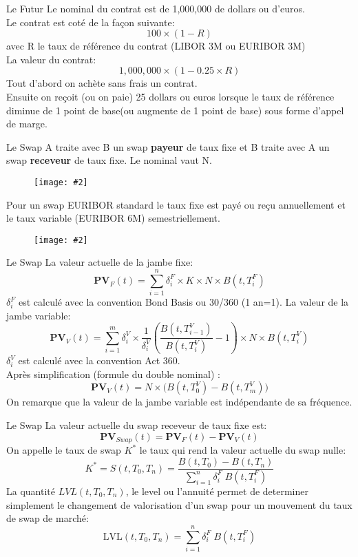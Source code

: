 \documentclass{beamer}
\newcommand{\FIG}[2]{\texttt{[image: \#2]}}
\begin{document}
\begin{frame}{Le Futur}
Le nominal du contrat est de 1,000,000 de dollars ou d'euros.\\
Le contrat est coté de la façon suivante:
\[
100\times(1 - R)
\] 
avec R le taux de référence du contrat (LIBOR 3M ou EURIBOR 3M)\\
La valeur du contrat:
\[
1,000,000\times(1-0.25\times R)
\]
Tout d'abord on achète sans frais un contrat.\\
Ensuite on reçoit (ou on paie) 25 dollars ou euros lorsque le taux de référence diminue de 1 point de base(ou augmente de 1 point de base) sous forme d'appel de marge.
\end{frame}

\begin{frame}{Le Swap}
A traite avec B un swap \textbf{payeur} de taux fixe et B traite avec A un swap \textbf{receveur} de taux fixe. Le nominal vaut N.
\begin{figure}[h]
\FIG{5cm}{figures/schema_swap_1.jpg}
\end{figure}
Pour un swap EURIBOR standard le taux fixe est payé ou reçu annuellement et le taux variable (EURIBOR 6M) semestriellement.
\begin{figure}[h]
\FIG{7cm}{figures/schema_swap_2.jpg}
\end{figure}
\end{frame}

\begin{frame}{Le Swap}
La valeur actuelle de la jambe fixe:
\[
\textbf{PV}_F(t) = \sum_{i=1}^{n}\delta_i^F \times K  \times  N  \times  B(t,T_i^F)
\]
$\delta_i^F$ est calculé avec la convention Bond Basis ou 30/360 (1 an=1).
La valeur de la jambe variable:
\[
\textbf{PV}_V(t) = \sum_{i=1}^{m}\delta_i^V \times \frac{1}{\delta_i^V}\left(\frac{B(t,T_{i-1}^V)}{B(t,T_i^V)}-1\right)  \times  N  \times  B(t,T_i^V)
\]
$\delta_i^V$ est calculé avec la convention Act 360.\\
Après simplification (formule du double nominal) :
\[
\textbf{PV}_V(t) = N \times \Big(B(t,T_0^V)-B(t,T_m^V)\Big)
\]
On remarque que la valeur de la jambe variable est indépendante de sa fréquence.
\end{frame}

\begin{frame}{Le Swap}
La valeur actuelle du swap receveur de taux fixe est:
\[
\textbf{PV}_{Swap}(t) = \textbf{PV}_F(t)-\textbf{PV}_V(t)
\]
On appelle le taux de swap $K^*$ le taux qui rend la valeur actuelle du swap nulle:
\[
K^*=S(t,T_0,T_n)=\frac{B(t,T_0)-B(t,T_n)}{ \sum_{i=1}^{n}\delta_i^F \;B(t,T_i^F)}
\]
La quantité ${LVL}(t,T_0,T_n)$, le level ou l'annuité permet de determiner simplement le changement de valorisation d'un swap pour un mouvement du taux de swap de marché:
\[
\text{LVL}(t,T_0,T_n)=  \sum_{i=1}^{n}\delta_i^F \;B(t,T_i^F)
\]
\end{frame}
\end{document}
